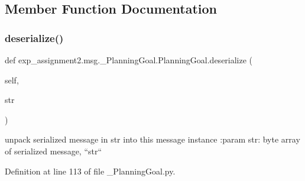 \subsection{Member Function Documentation}
\mbox{\label{classexp__assignment2_1_1msg_1_1__PlanningGoal_1_1PlanningGoal_a17a942c105c3bee5f7f2df0170e35976}} 
\subsubsection{\texorpdfstring{deserialize()}{deserialize()}}
{\footnotesize\ttfamily def exp\+\_\+assignment2.\+msg.\+\_\+\+Planning\+Goal.\+Planning\+Goal.\+deserialize (\begin{DoxyParamCaption}\item[{}]{self,  }\item[{}]{str }\end{DoxyParamCaption})}

\begin{DoxyVerb}unpack serialized message in str into this message instance
:param str: byte array of serialized message, ``str``
\end{DoxyVerb}
 

Definition at line 113 of file \+\_\+\+Planning\+Goal.\+py.



